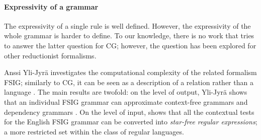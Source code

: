 \paragraph{Expressivity of a grammar}


The expressivity of a single rule is well defined. However, the expressivity of the whole grammar is harder to define. 
%
%
%
To our knowledge, there is no work that tries to answer the latter question for CG; however, the question has been explored for other reductionist formalisms.

Anssi Yli-Jyrä \cite{yli-jyra2005phd} investigates the computational complexity of the related formalism FSIG; 
similarly to CG, it can be seen as a description of a relation rather than a
language \cite{koskenniemi97}.
%
%
The main results are twofold: on the level of output, Yli-Jyrä shows that an individual FSIG grammar can approximate 
context-free grammars \cite{yli-jyra2003fsig_approx_cfg} 
and dependency grammars \cite{yli-jyra2004fsig_dependency}. 
On the level of input, \cite{yli-jyra2003describing} shows that all the contextual tests for the English FSIG grammar \cite{voutilainen1994designing} can be converted into \emph{star-free regular expressions}; a more restricted set within the class of regular languages.

